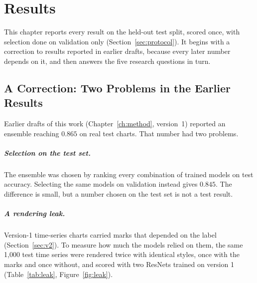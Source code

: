 \chapter{Results}
\label{ch:results}

This chapter reports every result on the held-out test split, scored once, with
selection done on validation only (Section~\ref{sec:protocol}). It begins with a
correction to results reported in earlier drafts, because every later number depends
on it, and then answers the five research questions in turn.

\section{A Correction: Two Problems in the Earlier Results}
\label{sec:leak}

Earlier drafts of this work (Chapter~\ref{ch:method}, version~1) reported an ensemble
reaching $0.865$ on real test charts. That number had two problems.

\paragraph{Selection on the test set.} The ensemble was chosen by ranking every
combination of trained models on test accuracy. Selecting the same models on
validation instead gives $0.845$. The difference is small, but a number chosen on the
test set is not a test result.

\paragraph{A rendering leak.} Version-1 time-series charts carried marks that depended
on the label (Section~\ref{sec:v2}). To measure how much the models relied on them, the
same 1{,}000 test time series were rendered twice with identical styles, once with the
marks and once without, and scored with two ResNets trained on version 1
(Table~\ref{tab:leak}, Figure~\ref{fig:leak}).

